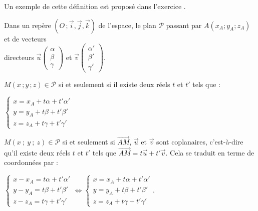\begin{remarque}
  Un exemple de cette définition est proposé dans l'exercice
  .
\end{remarque}

\begin{propriete}
  Dans un  repère $(O\,;\vec{i},\vec{j},\vec{k})$  de l'espace, le plan
  $\mathscr{P}$ passant par $A(x_A;y_A;z_A)$ et de vecteurs\\ directeurs
  $\vec{u} \begin {pmatrix} \alpha\\\beta\\\gamma \end{pmatrix}$ et
  $\vec{v} \begin {pmatrix} \alpha'\\\beta'\\\gamma' \end{pmatrix}$. 

  $M(x\,;y\,;z)\in \mathscr{P}$ si et seulement si il existe deux réels
  $t$ et $t'$ tels que :
  \begin{center}
    $\begin{cases}
      x=x_A+t\alpha+t'\alpha' \\
      y=y_A+t\beta +t'\beta'  \\
      z=z_A+t\gamma +t'\gamma' 
    \end{cases}$
  \end{center}
\end{propriete}

\begin{preuve}
  $M(x\ ;\ y\ ;\ z)\in \mathscr{P}$ si et seulement si
  $\overrightarrow{AM}$, $\vec{u}$ et $\vec{v}$ sont coplanaires,
  c'est-à-dire qu'il existe deux réels $t$ et $t'$ tels que
  $\overrightarrow{AM}=t\overrightarrow{u}+t'\overrightarrow{v}$.
  Cela se traduit en terme de coordonnées par :
\begin{center}
  $\begin{cases}x-x_A=t\alpha+t'\alpha' \\
    y-y_A=t\beta +t'\beta' \\
    z-z_A=t\gamma + t'\gamma'
  \end{cases}
  \Leftrightarrow
  \begin{cases}
    x=x_A+t\alpha+t'\alpha' \\
    y=y_A+t\beta +t'\beta' \\
    z=z_A+t\gamma +t'\gamma' 
  \end{cases}$.
\end{center}
\end{preuve}

